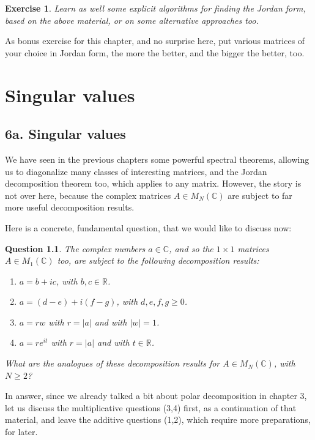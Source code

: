 \documentclass[12pt]{amsbook}
\newtheorem{exercise}[theorem]{Exercise}
\newtheorem{question}[theorem]{Question}
\begin{document}
\begin{exercise}
Learn as well some explicit algorithms for finding the Jordan form, based on the above material, or on some alternative approaches too.
\end{exercise}

As bonus exercise for this chapter, and no surprise here, put various matrices of your choice in Jordan form, the more the better, and the bigger the better, too.

\chapter{Singular values}

\section*{6a. Singular values}

We have seen in the previous chapters some powerful spectral theorems, allowing us to diagonalize many classes of interesting matrices, and the Jordan decomposition theorem too, which applies to any matrix. However, the story is not over here, because the complex matrices $A\in M_N(\mathbb C)$ are subject to far more useful decomposition results.

\bigskip

Here is a concrete, fundamental question, that we would like to discuss now:

\begin{question}
The complex numbers $a\in\mathbb C$, and so the $1\times1$ matrices $A\in M_1(\mathbb C)$ too, are subject to the following decomposition results:
\begin{enumerate}
\item $a=b+ic$, with $b,c\in\mathbb R$.

\item $a=(d-e)+i(f-g)$, with $d,e,f,g\geq0$.

\item $a=rw$ with $r=|a|$ and with $|w|=1$.

\item $a=re^{it}$ with $r=|a|$ and with $t\in\mathbb R$.
\end{enumerate}
What are the analogues of these decomposition results for $A\in M_N(\mathbb C)$, with $N\geq2$?
\end{question}

In answer, since we already talked a bit about polar decomposition in chapter 3, let us discuss the multiplicative questions (3,4) first, as a continuation of that material, and leave the additive questions (1,2), which require more preparations, for later.
\end{document}
